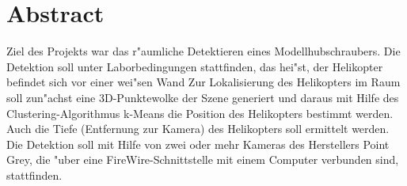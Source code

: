 \chapter*{Abstract}
Ziel des Projekts war das r"aumliche Detektieren eines Modellhubschraubers. Die Detektion soll unter Laborbedingungen stattfinden, das hei"st, der Helikopter befindet sich vor einer wei"sen Wand
Zur Lokalisierung des Helikopters im Raum soll zun"achst eine 3D-Punktewolke der Szene generiert und daraus mit Hilfe des Clustering-Algorithmus k-Means die Position des Helikopters bestimmt werden. Auch die Tiefe (Entfernung zur Kamera) des Helikopters soll ermittelt werden. Die Detektion soll mit Hilfe von zwei oder mehr Kameras des Herstellers Point Grey, die "uber eine FireWire-Schnittstelle mit einem Computer verbunden sind, stattfinden.